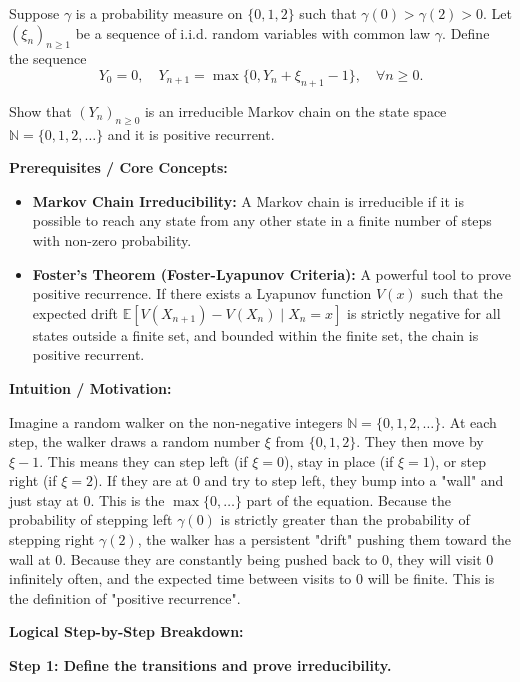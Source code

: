 \begin{exercise}\label{probability:2019:2}
Suppose $\gamma$ is a probability measure on $\{0,1,2\}$ such that $\gamma(0) > \gamma(2) > 0$. Let $(\xi_n)_{n \geq 1}$ be a sequence of i.i.d. random variables with common law $\gamma$. Define the sequence
\[
Y_0 = 0, \quad Y_{n+1} = \max\{0, Y_n + \xi_{n+1} - 1\}, \quad \forall n \geq 0.
\]

Show that $(Y_n)_{n \geq 0}$ is an irreducible Markov chain on the state space $\mathbb{N} = \{0,1,2,\ldots\}$ and it is positive recurrent.
\end{exercise}

\begin{solution}
\textbf{Prerequisites / Core Concepts:}
\begin{itemize}
    \item \textbf{Markov Chain Irreducibility:} A Markov chain is irreducible if it is possible to reach any state from any other state in a finite number of steps with non-zero probability.
    \item \textbf{Foster's Theorem (Foster-Lyapunov Criteria):} A powerful tool to prove positive recurrence. If there exists a Lyapunov function $V(x)$ such that the expected drift $\mathbb{E}[V(X_{n+1}) - V(X_n) \mid X_n = x]$ is strictly negative for all states outside a finite set, and bounded within the finite set, the chain is positive recurrent.
\end{itemize}

\textbf{Intuition / Motivation:}

Imagine a random walker on the non-negative integers $\mathbb{N} = \{0, 1, 2, \dots\}$. 
At each step, the walker draws a random number $\xi$ from $\{0, 1, 2\}$. They then move by $\xi - 1$. This means they can step left (if $\xi=0$), stay in place (if $\xi=1$), or step right (if $\xi=2$).
If they are at 0 and try to step left, they bump into a "wall" and just stay at 0. This is the $\max\{0, \dots\}$ part of the equation.
Because the probability of stepping left $\gamma(0)$ is strictly greater than the probability of stepping right $\gamma(2)$, the walker has a persistent "drift" pushing them toward the wall at 0. Because they are constantly being pushed back to 0, they will visit 0 infinitely often, and the expected time between visits to 0 will be finite. This is the definition of "positive recurrence".

\textbf{Logical Step-by-Step Breakdown:}

\textbf{Step 1: Define the transitions and prove irreducibility.}


\end{solution}
